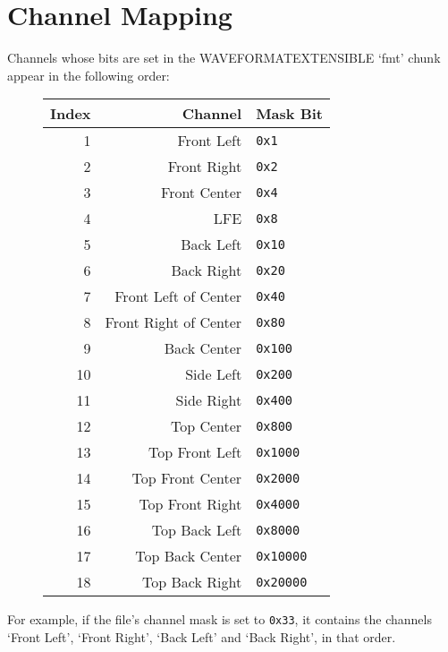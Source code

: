 \section{Channel Mapping}
Channels whose bits are set in the WAVEFORMATEXTENSIBLE `fmt' chunk
appear in the following order:
\begin{figure}[h]
\begin{tabular}{| r | r | l |}
\hline
Index & Channel & Mask Bit \\
\hline
1 & Front Left & \texttt{0x1} \\
2 & Front Right & \texttt{0x2} \\
3 & Front Center & \texttt{0x4} \\
4 & LFE & \texttt{0x8} \\
5 & Back Left & \texttt{0x10} \\
6 & Back Right & \texttt{0x20} \\
7 & Front Left of Center & \texttt{0x40} \\
8 & Front Right of Center & \texttt{0x80} \\
9 & Back Center & \texttt{0x100} \\
10 & Side Left & \texttt{0x200} \\
11 & Side Right & \texttt{0x400} \\
12 & Top Center & \texttt{0x800} \\
13 & Top Front Left & \texttt{0x1000} \\
14 & Top Front Center & \texttt{0x2000} \\
15 & Top Front Right & \texttt{0x4000} \\
16 & Top Back Left & \texttt{0x8000} \\
17 & Top Back Center & \texttt{0x10000} \\
18 & Top Back Right & \texttt{0x20000} \\
\hline
\end{tabular}
\end{figure}
\par
\noindent
For example, if the file's channel mask is set to \texttt{0x33},
it contains the channels `Front Left', `Front Right',
`Back Left' and `Back Right', in that order.
